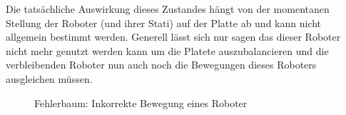 Die tats{\"{a}}chliche Auswirkung dieses Zustandes h{\"{a}}ngt von der momentanen Stellung der Roboter (und ihrer
Stati) auf der Platte ab und kann nicht allgemein bestimmt werden. Generell l{\"{a}}sst sich nur sagen das dieser
Roboter nicht mehr genutzt werden kann um die Platete auszubalancieren und die verbleibenden Roboter nun auch noch
die Bewegungen dieses Roboters ausgleichen m{\"{u}}ssen.

\begin{figure}
	\centering
	\caption{Fehlerbaum: Inkorrekte Bewegung eines Roboter}
	\label{fig:fault-tree-robot2}
\end{figure}


